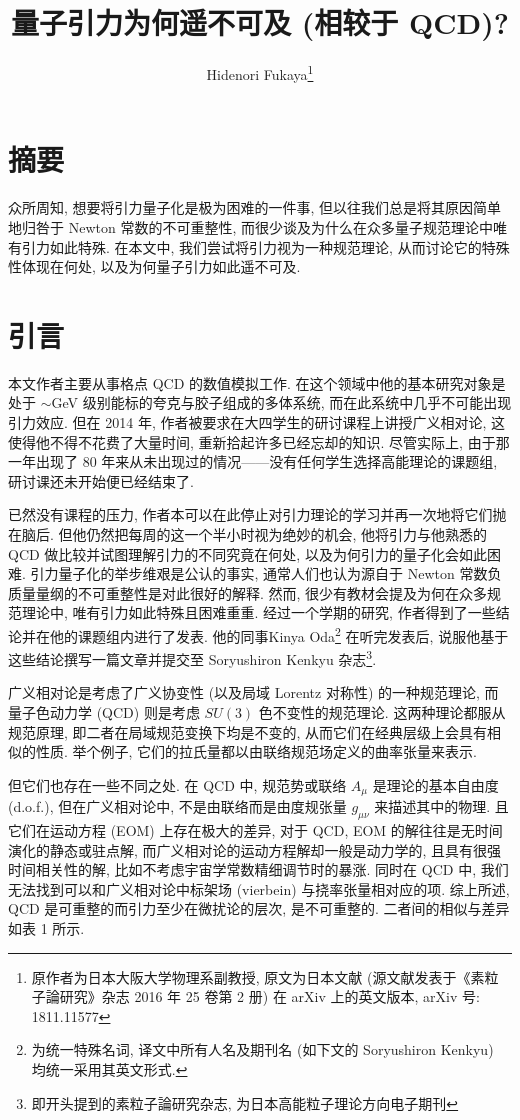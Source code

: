 \documentclass{article}
\title{\textbf{量子引力为何遥不可及 (相较于 QCD)?}}
\author{Hidenori Fukaya\footnote{原作者为日本大阪大学物理系副教授, 原文为日本文献 (源文献发表于《素粒子論研究》杂志 2016 年 25 卷第 2 册) 在 arXiv 上的英文版本, arXiv 号: 1811.11577}}
\begin{document}
\CJKspace
\newpage
{}
\newpage
{}
\maketitle


\section*{摘要}
众所周知, 想要将引力量子化是极为困难的一件事, 但以往我们总是将其原因简单地归咎于 Newton 常数的不可重整性, 而很少谈及为什么在众多量子规范理论中唯有引力如此特殊. 在本文中, 我们尝试将引力视为一种规范理论, 从而讨论它的特殊性体现在何处, 以及为何量子引力如此遥不可及.
\section{引言}
本文作者主要从事格点 QCD 的数值模拟工作. 在这个领域中他的基本研究对象是处于 $\sim$GeV 级别能标的夸克与胶子组成的多体系统, 而在此系统中几乎不可能出现引力效应. 但在 2014 年, 作者被要求在大四学生的研讨课程上讲授广义相对论, 这使得他不得不花费了大量时间, 重新拾起许多已经忘却的知识. 尽管实际上, 由于那一年出现了 80 年来从未出现过的情况——没有任何学生选择高能理论的课题组, 研讨课还未开始便已经结束了.
\par
已然没有课程的压力, 作者本可以在此停止对引力理论的学习并再一次地将它们抛在脑后. 但他仍然把每周的这一个半小时视为绝妙的机会, 他将引力与他熟悉的 QCD 做比较并试图理解引力的不同究竟在何处, 以及为何引力的量子化会如此困难. 引力量子化的举步维艰是公认的事实, 通常人们也认为源自于 Newton 常数负质量量纲的不可重整性是对此很好的解释. 然而, 很少有教材会提及为何在众多规范理论中, 唯有引力如此特殊且困难重重. 经过一个学期的研究, 作者得到了一些结论并在他的课题组内进行了发表. 他的同事Kinya Oda\footnote{为统一特殊名词, 译文中所有人名及期刊名 (如下文的 Soryushiron Kenkyu) 均统一采用其英文形式.} 在听完发表后, 说服他基于这些结论撰写一篇文章并提交至 Soryushiron Kenkyu 杂志\footnote{即开头提到的素粒子論研究杂志, 为日本高能粒子理论方向电子期刊}.
\par
广义相对论是考虑了广义协变性 (以及局域 Lorentz 对称性) 的一种规范理论, 而量子色动力学 (QCD) 则是考虑 $SU(3)$ 色不变性的规范理论. 这两种理论都服从规范原理, 即二者在局域规范变换下均是不变的, 从而它们在经典层级上会具有相似的性质. 举个例子, 它们的拉氏量都以由联络规范场定义的曲率张量来表示.
\par
但它们也存在一些不同之处. 在 QCD 中, 规范势或联络 $A_{\mu}$ 是理论的基本自由度 (d.o.f.), 但在广义相对论中, 不是由联络而是由度规张量 $g_{\mu\nu}$ 来描述其中的物理. 且它们在运动方程 (EOM) 上存在极大的差异, 对于 QCD, EOM 的解往往是无时间演化的静态或驻点解, 而广义相对论的运动方程解却一般是动力学的, 且具有很强时间相关性的解, 比如不考虑宇宙学常数精细调节时的暴涨. 同时在 QCD 中, 我们无法找到可以和广义相对论中标架场 (vierbein) 与挠率张量相对应的项. 综上所述, QCD 是可重整的而引力至少在微扰论的层次, 是不可重整的. 二者间的相似与差异如表 1 所示.
\end{document}
